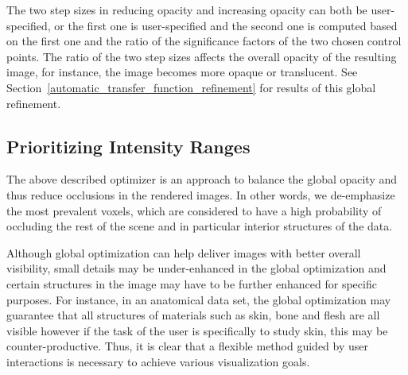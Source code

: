 The two step sizes in reducing opacity and increasing opacity can both be user-specified, or the first one is user-specified and the second one is computed based on the first one and the ratio of the significance factors of the two chosen control points. The ratio of the two step sizes affects the overall opacity of the resulting image, for instance, the image becomes more opaque or translucent. See Section~\ref{automatic_transfer_function_refinement} for results of this global refinement.


\subsection{Prioritizing Intensity Ranges \label{interaction_methods}}
The above described optimizer is an approach to balance the global opacity and thus reduce occlusions in the rendered images. In other words, we de-emphasize the most prevalent voxels, which are considered to have a high probability of occluding the rest of the scene and in particular interior structures of the data.

Although global optimization can help deliver images with better overall visibility, small details may be under-enhanced in the global optimization and certain structures in the image may have to be further enhanced for specific purposes. For instance, in an anatomical data set, the global optimization may guarantee that all structures of materials such as skin, bone and flesh are all visible however if the task of the user is specifically to study skin, this may be counter-productive. Thus, it is clear that a flexible method guided by user interactions is necessary to achieve various visualization goals. 

